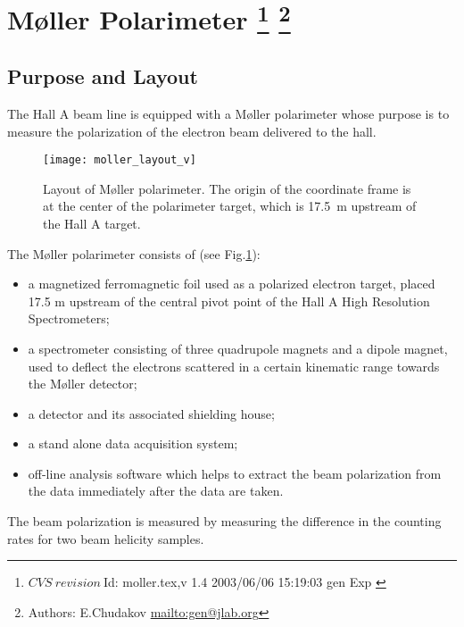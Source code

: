 \section[M{\o}ller Polarimeter]{M{\o}ller Polarimeter
\footnote{
  $CVS~revision~ $Id: moller.tex,v 1.4 2003/06/06 15:19:03 gen Exp $ $
}
\footnote{Authors: E.Chudakov \url{mailto:gen@jlab.org}}
}
\label{sec:moller}
\subsection {Purpose and Layout}
\label{sec:moller_purpose}

The Hall A beam line is equipped with a M{\o}ller 
polarimeter
whose purpose is 
to measure the polarization of the electron beam delivered to the hall. 

 \begin{figure}[bht]
    \begin{center}
        \texttt{[image: moller\_layout\_v]}
    \end{center}
    \caption{Layout of M{\o}ller polarimeter. The origin of the 
            coordinate frame is at the center of the polarimeter
             target, which is 17.5~m upstream of the Hall A target.
            }
    \label{fig:moller_layout} 
 \end{figure}  

The M{\o}ller polarimeter consists of (see Fig.\ref{fig:moller_layout}):
\begin{itemize}
\item  a magnetized ferromagnetic foil used as a polarized electron target,
       placed 17.5 m upstream of the central 
       pivot point of the Hall A High Resolution Spectrometers;

\item a spectrometer consisting of three quadrupole magnets and a dipole magnet,
      used to deflect the electrons scattered in a certain kinematic
      range towards the M{\o}ller detector;

\item a detector and its associated shielding house;
\item a stand alone data acquisition system;
\item off-line analysis software which helps to extract the beam polarization
      from the data immediately after the data are taken. 
\end{itemize}

The beam polarization is measured by measuring the difference
in the counting rates for two beam helicity samples.  

